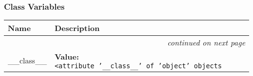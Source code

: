 
  \subsubsection{Class Variables}

\begin{longtable}{|p{}|p{}|l}
\cline{1-2}
\cline{1-2} \centering \textbf{Name} & \centering \textbf{Description}& \\
\cline{1-2}
\endhead\cline{1-2}\multicolumn{3}{r}{\small\textit{continued on next page}}\\\endfoot\cline{1-2}
\endlastfoot\raggedright \_\-\_\-c\-l\-a\-s\-s\-\_\-\_\- & \textbf{Value:} 
{\tt {\textless}\-a\-t\-t\-r\-i\-b\-u\-t\-e\-~\-'\-\_\-\_\-c\-l\-a\-s\-s\-\_\-\_\-'\-~\-o\-f\-~\-'\-o\-b\-j\-e\-c\-t\-'\-~\-o\-b\-j\-e\-c\-t\-s\-{\textgreater}\-}&\\
\cline{1-2}
\end{longtable}

